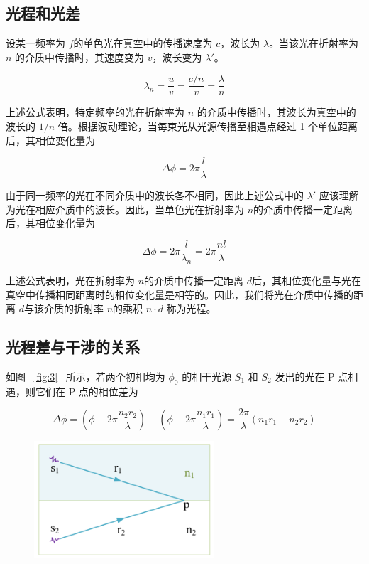\documentclass[withoutpreface,bwprint]{cumcmthesis} %
\begin{document}
\begin{appendices}
    \subsection{光程和光差}
    设某一频率为 $f$的单色光在真空中的传播速度为 $c$，波长为 $\lambda$。当该光在折射率为 $n$ 的介质中传播时，其速度变为 $v$，波长变为 $\lambda'$。

    \[\lambda_{n} = \frac{u}{v} = \frac{c/n}{v} = \frac{\lambda}{n}\]

    上述公式表明，特定频率的光在折射率为 $n$ 的介质中传播时，其波长为真空中的波长的 $1/n$ 倍。根据波动理论，当每束光从光源传播至相遇点经过 1 个单位距离后，其相位变化量为


    \[\Delta\phi = 2\pi\frac{l}{\lambda}\]

    由于同一频率的光在不同介质中的波长各不相同，因此上述公式中的 $\lambda'$ 应该理解为光在相应介质中的波长。因此，当单色光在折射率为 $n$的介质中传播一定距离后，其相位变化量为

    \[\Delta\phi = 2\pi\frac{l}{\lambda_{n}} = 2\pi\frac{nl}{\lambda}\]


    上述公式表明，光在折射率为 $n$的介质中传播一定距离 $d$后，其相位变化量与光在真空中传播相同距离时的相位变化量是相等的。因此，我们将光在介质中传播的距离 $d$与该介质的折射率 $n$的乘积 $n\cdot d$ 称为光程。


    \subsection{光程差与干涉的关系}

    如图 ~\eqref{fig:3}~ 所示，若两个初相均为 $\phi_0$ 的相干光源 $S_1$ 和 $S_2$ 发出的光在 P 点相遇，则它们在 P 点的相位差为

    \[\Delta\phi = \left( \phi - 2\pi\frac{n_{2}r_{2}}{\lambda} \right) - \left( \phi - 2\pi\frac{n_{1}r_{1}}{\lambda} \right) = \frac{2\pi}{\lambda}\left( n_{1}r_{1} - n_{2}r_{2} \right)\]

    \begin{figure}[ht]
        \centering
        \includegraphics[width=0.6\textwidth]{figures/figure3.png} %


\end{figure}
\end{appendices}
\end{document}
